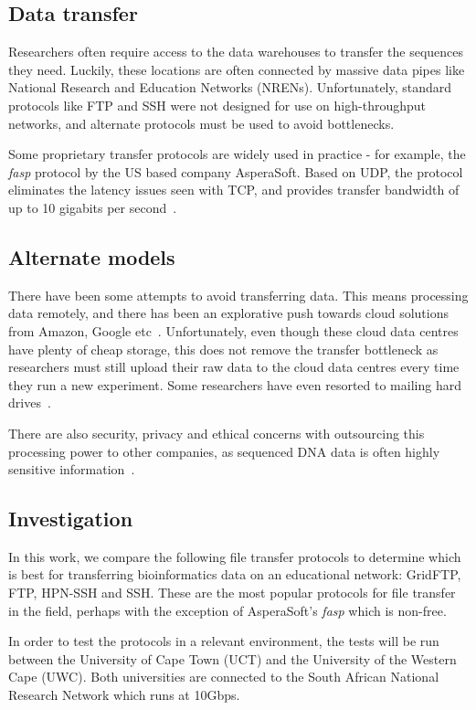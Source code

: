 \documentclass{sig-alternate-05-2015}
\begin{document}
\subsection{Data transfer}
Researchers often require access to the data warehouses to transfer the sequences they need. Luckily, these locations are often connected by massive data pipes like National Research and Education Networks (NRENs). Unfortunately, standard protocols like FTP and SSH were not designed for use on high-throughput networks, and alternate protocols must be used to avoid bottlenecks.

Some proprietary transfer protocols are widely used in practice - for example, the \textit{fasp} protocol by the US based company AsperaSoft. Based on UDP, the protocol eliminates the latency issues seen with TCP, and provides transfer bandwidth of up to 10 gigabits per second~\cite{beloslyudtsev2014aspera}.

\subsection{Alternate models}
There have been some attempts to avoid transferring data. This means processing data remotely, and there has been an explorative push towards cloud solutions from Amazon, Google etc~\cite{baker2010next}. Unfortunately, even though these cloud data centres have plenty of cheap storage, this does not remove the transfer bottleneck as researchers must still upload their raw data to the cloud data centres every time they run a new experiment. Some researchers have even resorted to mailing hard drives~\cite{baker2010next}.

There are also security, privacy and ethical concerns with outsourcing this processing power to other companies, as sequenced DNA data is often highly sensitive information~\cite{marx2013biology}.

\subsection{Investigation}
In this work, we compare the following file transfer protocols to determine which is best for transferring bioinformatics data on an educational network: GridFTP, FTP, HPN-SSH and SSH.
These are the most popular protocols for file transfer in the field, perhaps with the exception of AsperaSoft's \textit{fasp} which is non-free. 

In order to test the protocols in a relevant environment, the tests will be run between the University of Cape Town (UCT) and the University of the Western Cape (UWC). Both universities are connected to the South African National Research Network \cite{sanren} which runs at 10Gbps.
\end{document}
